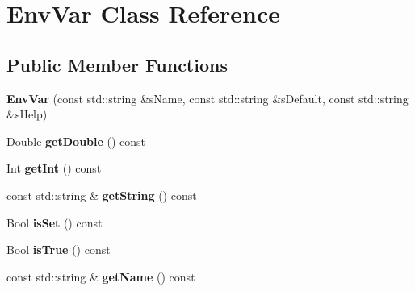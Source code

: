 \hypertarget{class_env_var}{}\section{Env\+Var Class Reference}
\label{class_env_var}
\subsection*{Public Member Functions}
\begin{DoxyCompactItemize}
\item 
\mbox{\label{class_env_var_a43c64ab8cb6e2f5fefb48bb23f0a1ebc}} 
{\bfseries Env\+Var} (const std\+::string \&s\+Name, const std\+::string \&s\+Default, const std\+::string \&s\+Help)
\item 
\mbox{\label{class_env_var_a3c362974643e9562c41ed9c16061aaba}} 
Double {\bfseries get\+Double} () const
\item 
\mbox{\label{class_env_var_af0c4930ea53ed39ab50a66b6d3654f33}} 
Int {\bfseries get\+Int} () const
\item 
\mbox{\label{class_env_var_a9ec469eeeae266d0ebef01f6e0fe73ea}} 
const std\+::string \& {\bfseries get\+String} () const
\item 
\mbox{\label{class_env_var_ab10cf37f2605210a803098c9327db066}} 
Bool {\bfseries is\+Set} () const
\item 
\mbox{\label{class_env_var_ae48015871f2bae664a5cc9fc059c7dde}} 
Bool {\bfseries is\+True} () const
\item 
\mbox{\label{class_env_var_a5a8bbbecae236448786e9c1eac869639}} 
const std\+::string \& {\bfseries get\+Name} () const
\end{DoxyCompactItemize}
